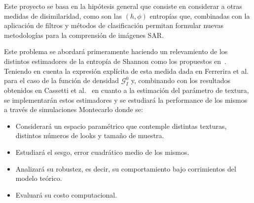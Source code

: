 \documentclass[12pt]{article}
\begin{document}


Este proyecto se basa en la hipótesis general que consiste en considerar a otras medidas de disimilaridad, como son las $(h,\phi)$ entropías que, combinadas con la aplicación de filtros y métodos de clasificación permitan formular nuevas metodologías para la comprensión de imágenes SAR.

Este problema se abordará primeramente haciendo un relevamiento de los distintos estimadores de la entropía de Shannon como los propuestos en~\cite{AlOmari2013,Behmardi2011,Beirlant1997}. 
Teniendo en cuenta la expresión explícita de esta medida dada en Ferrerira et al.~\cite{Ferreira2020} para el caso de la función de densidad $\mathcal{G}_I^0$ y, combinando con los resultados obtenidos en Cassetti et al.~\cite{Cassetti2020} en cuanto a la estimación del parámetro de textura, se implementarán estos estimadores y se estudiará la performance de los mismos a través de simulaciones Montecarlo donde se:
\begin{itemize}
	\item Considerará un espacio paramétrico que contemple distintas texturas, distintos números de looks y tamaño de muestra.
	\item Estudiará el sesgo, error cuadrático medio de los mismos.
	\item Analizará su robustez, es decir, su comportamiento bajo corrimientos del modelo teórico. 
	\item Evaluará su costo computacional.
\end{itemize} 
\end{document}
